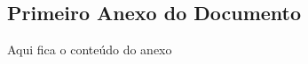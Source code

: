 \postextual



%
%





\begin{anexosenv}

\chapter{Primeiro Anexo do Documento}
Aqui fica o conteúdo do anexo

\end{anexosenv}